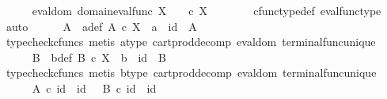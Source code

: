 \begin{isabellebody}
\isanewline
\ \ \ \ \isamarkupfalse%
\ eval{\isacharunderscore}{\kern0pt}dom{\isacharcolon}{\kern0pt}\ {\isachardoublequoteopen}domain{\isacharparenleft}{\kern0pt}eval{\isacharunderscore}{\kern0pt}func\ X\ {\isasymone}{\isacharparenright}{\kern0pt}\ {\isacharequal}{\kern0pt}\ {\isasymone}\ {\isasymtimes}\isactrlsub c\ {\isacharparenleft}{\kern0pt}X\isactrlbsup {\isasymone}\isactrlesup {\isacharparenright}{\kern0pt}{\isachardoublequoteclose}\isanewline
\ \ \ \ \ \ \isamarkupfalse%
\ cfunc{\isacharunderscore}{\kern0pt}type{\isacharunderscore}{\kern0pt}def\ eval{\isacharunderscore}{\kern0pt}func{\isacharunderscore}{\kern0pt}type\ \isamarkupfalse%
\ auto\isanewline
\isanewline
\ \ \ \ \isamarkupfalse%
\ A\ \ a{\isacharunderscore}{\kern0pt}def{\isacharcolon}{\kern0pt}\ {\isachardoublequoteopen}A\ {\isasymin}\isactrlsub c\ X\isactrlbsup {\isasymone}\isactrlesup \ {\isasymand}\ a\ {\isacharequal}{\kern0pt}\ {\isasymlangle}id\ {\isasymone}{\isacharcomma}{\kern0pt}\ A{\isasymrangle}{\isachardoublequoteclose}\isanewline
\ \ \ \ \ \ \isamarkupfalse%
\ {\isacharparenleft}{\kern0pt}typecheck{\isacharunderscore}{\kern0pt}cfuncs{\isacharcomma}{\kern0pt}\ metis\ a{\isacharunderscore}{\kern0pt}type\ cart{\isacharunderscore}{\kern0pt}prod{\isacharunderscore}{\kern0pt}decomp\ eval{\isacharunderscore}{\kern0pt}dom\ terminal{\isacharunderscore}{\kern0pt}func{\isacharunderscore}{\kern0pt}unique{\isacharparenright}{\kern0pt}\isanewline
\isanewline
\ \ \ \ \isamarkupfalse%
\ B\ \ b{\isacharunderscore}{\kern0pt}def{\isacharcolon}{\kern0pt}\ {\isachardoublequoteopen}B\ {\isasymin}\isactrlsub c\ X\isactrlbsup {\isasymone}\isactrlesup \ {\isasymand}\ b\ {\isacharequal}{\kern0pt}\ {\isasymlangle}id\ {\isasymone}{\isacharcomma}{\kern0pt}\ B{\isasymrangle}{\isachardoublequoteclose}\isanewline
\ \ \ \ \ \ \isamarkupfalse%
\ {\isacharparenleft}{\kern0pt}typecheck{\isacharunderscore}{\kern0pt}cfuncs{\isacharcomma}{\kern0pt}\ metis\ b{\isacharunderscore}{\kern0pt}type\ cart{\isacharunderscore}{\kern0pt}prod{\isacharunderscore}{\kern0pt}decomp\ eval{\isacharunderscore}{\kern0pt}dom\ terminal{\isacharunderscore}{\kern0pt}func{\isacharunderscore}{\kern0pt}unique{\isacharparenright}{\kern0pt}\isanewline
\isanewline
\ \ \ \ \isamarkupfalse%
\ {\isachardoublequoteopen}A\isactrlsup {\isasymflat}\ {\isasymcirc}\isactrlsub c\ {\isasymlangle}id\ {\isasymone}{\isacharcomma}{\kern0pt}\ id\ {\isasymone}{\isasymrangle}\ {\isacharequal}{\kern0pt}\ B\isactrlsup {\isasymflat}\ {\isasymcirc}\isactrlsub c\ {\isasymlangle}id\ {\isasymone}{\isacharcomma}{\kern0pt}\ id\ {\isasymone}{\isasymrangle}{\isachardoublequoteclose}\isanewline

\end{isabellebody}
